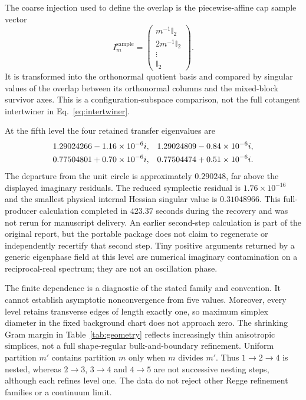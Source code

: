 \documentclass[11pt]{article}
\theoremstyle{remark}\newtheorem{remark}[theorem]{Remark}
\newcommand{\Id}{\mathbb I}
\begin{document}
The coarse injection used to define the overlap is the piecewise-affine cap sample vector
\begin{equation}
I_m^{\mathrm{sample}}=
\begin{pmatrix}m^{-1}\Id_2\\2m^{-1}\Id_2\\\vdots\\\Id_2\end{pmatrix}.
\label{eq:injection}
\end{equation}
It is transformed into the orthonormal quotient basis and compared by singular values of the overlap between its orthonormal columns and the mixed-block survivor axes.
This is a configuration-subspace comparison, not the full cotangent intertwiner in Eq.~\eqref{eq:intertwiner}.

At the fifth level the four retained transfer eigenvalues are
\begin{align}
1.29024266-1.16\times10^{-6}i,&\quad
1.29024809-0.84\times10^{-6}i,\notag\\
0.77504801+0.70\times10^{-6}i,&\quad
0.77504474+0.51\times10^{-6}i.
\label{eq:fifth}
\end{align}
The departure from the unit circle is approximately $0.290248$, far above the displayed imaginary residuals.
The reduced symplectic residual is $1.76\times10^{-16}$ and the smallest physical internal Hessian singular value is $0.31048966$.
This full-producer calculation completed in $423.37$ seconds during the recovery and was not rerun for manuscript delivery.
An earlier second-step calculation is part of the original report, but the portable package does not claim to regenerate or independently recertify that second step.
Tiny positive arguments returned by a generic eigenphase field at this level are numerical imaginary contamination on a reciprocal-real spectrum; they are not an oscillation phase.

The finite dependence is a diagnostic of the stated family and convention.
It cannot establish asymptotic nonconvergence from five values.
Moreover, every level retains transverse edges of length exactly one, so maximum simplex diameter in the fixed background chart does not approach zero.
The shrinking Gram margin in Table~\ref{tab:geometry} reflects increasingly thin anisotropic simplices, not a full shape-regular bulk-and-boundary refinement.
Uniform partition $m'$ contains partition $m$ only when $m$ divides $m'$.
Thus $1\to2\to4$ is nested, whereas $2\to3$, $3\to4$ and $4\to5$ are not successive nesting steps, although each refines level one.
The data do not reject other Regge refinement families or a continuum limit.
\end{document}
